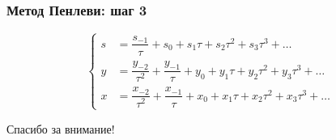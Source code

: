\documentclass[14pt]{beamer}
\begin{document}
\begin{frame}

\frametitle{Метод Пенлеви: шаг 3}

$$
        \left\{
                \begin{aligned}
                        s &= \dfrac{s_{-1}}{\tau} + s_0 + s_1\tau + s_2\tau^2 + s_3\tau^3 + \ldots \\
                        y &= \dfrac{y_{-2}}{\tau^2} + \dfrac{y_{-1}}{\tau} + y_0 + y_1\tau + y_2\tau^2 + y_3\tau^3 + \ldots \\
                        x &= \dfrac{x_{-2}}{\tau^2} + \dfrac{x_{-1}}{\tau} + x_0 + x_1\tau + x_2\tau^2 + x_3\tau^3 + \ldots
                \end{aligned}
        \right.
$$
\end{frame}
%
%
%
%
%
%
%
%
%
%
%
%
%
%
%
%
%
%
%
%
%
%
%
%
%
%
%

\begin{frame}
\begin{center}
Спасибо за внимание!
\end{center}
\end{frame}
\end{document}
